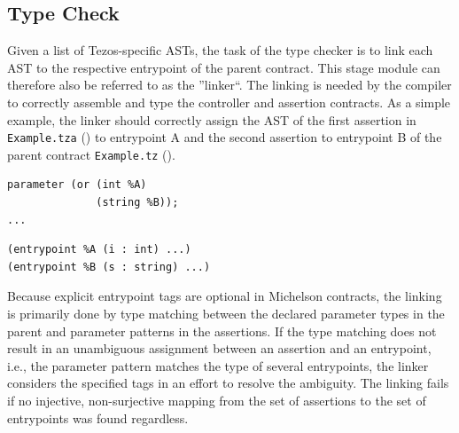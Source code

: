 \subsection{Type Check}\label{sec:typecheck}
Given a list of Tezos-specific ASTs, the task of the type checker is to link each AST to the respective entrypoint of the parent contract. This stage module can therefore also be referred to as the ''linker``. The linking is needed by the compiler to correctly assemble and type the controller and assertion contracts. As a simple example, the linker should correctly assign the AST of the first assertion in \texttt{Example.tza} () to entrypoint A and the second assertion to entrypoint B of the parent contract \texttt{Example.tz} (). 

\vspace{\baselineskip}
\noindent
\begin{minipage}{.45\textwidth}
\begin{lstlisting}[label=lst:linker_parent, numbers=none, language=Michelson, caption=Example.tz]
parameter (or (int %A)
              (string %B));
...
\end{lstlisting}
\end{minipage}\hfill
\begin{minipage}{.5\textwidth}
\begin{lstlisting}[label=lst:linker_assertion, numbers=none, language=Assertion, caption=Example.tza]
(entrypoint %A (i : int) ...)
(entrypoint %B (s : string) ...)
\end{lstlisting}
\end{minipage}
\vspace{\baselineskip}

Because explicit entrypoint tags are optional in Michelson contracts, the linking is primarily done by type matching between the declared parameter types in the parent and parameter patterns in the assertions. If the type matching does not result in an unambiguous assignment between an assertion and an entrypoint, i.e., the parameter pattern matches the type of several entrypoints, the linker considers the specified tags in an effort to resolve the ambiguity. The linking fails if no injective, non-surjective mapping from the set of assertions to the set of entrypoints was found regardless. 

